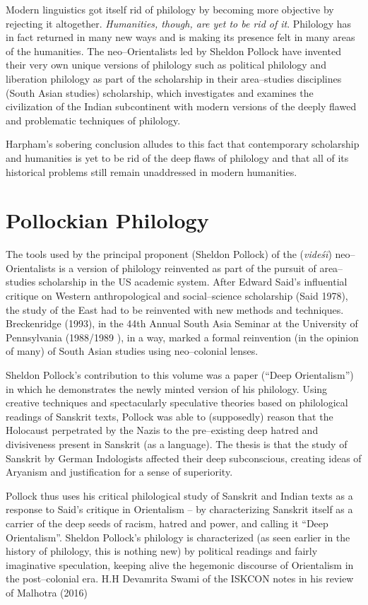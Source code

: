Modern linguistics got itself rid of philology by becoming more objective by rejecting it altogether. \textit{Humanities, though, are yet to be rid of it}. Philology has in fact returned in many new ways and is making its presence felt in many areas of the humanities. The neo–Orientalists led by Sheldon Pollock have invented their very own unique versions of philology such as political philology and liberation philology as part of the scholarship in their area–studies disciplines (South Asian studies) scholarship, which investigates and examines the civilization of the Indian subcontinent with modern versions of the deeply flawed and problematic techniques of philology.

Harpham’s sobering conclusion alludes to this fact that contemporary scholarship and humanities is yet to be rid of the deep flaws of philology and that all of its historical problems still remain unaddressed in modern humanities.


\section*{Pollockian Philology}

The tools used by the principal proponent (Sheldon Pollock) of the (\textit{videśī}) neo–Orientalists is a version of philology reinvented as part of the pursuit of area–studies scholarship in the US academic system. After Edward Said’s influential critique on Western anthropological and social–science scholarship (Said 1978), the study of the East had to be reinvented with new methods and techniques. Breckenridge (1993), in the 44th Annual South Asia Seminar at the University of Pennsylvania (1988/1989 ), in a way, marked a formal reinvention (in the opinion of many) of South Asian studies using neo–colonial lenses.

\newpage

Sheldon Pollock’s contribution to this volume was a paper (“Deep Orientalism”) in which he demonstrates the newly minted version of his philology. Using creative techniques and spectacularly speculative theories based on philological readings of Sanskrit texts, Pollock was able to (supposedly) reason that the Holocaust perpetrated by the Nazis to the pre–existing deep hatred and divisiveness present in Sanskrit (as a language). The thesis is that the study of Sanskrit by German Indologists affected their deep subconscious, creating ideas of Aryanism and justification for a sense of superiority.

Pollock thus uses his critical philological study of Sanskrit and Indian texts as a response to Said’s critique in Orientalism – by characterizing Sanskrit itself as a carrier of the deep seeds of racism, hatred and power, and calling it “Deep Orientalism”. Sheldon Pollock’s philology is characterized (as seen earlier in the history of philology, this is nothing new) by political readings and fairly imaginative speculation, keeping alive the hegemonic discourse of Orientalism in the post–colonial era. H.H Devamrita Swami of the ISKCON notes in his review of Malhotra (2016)

